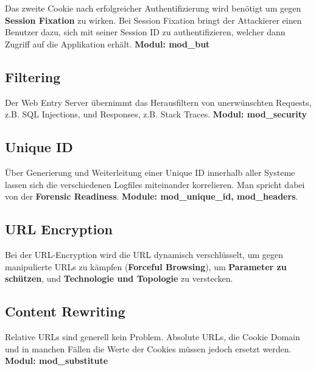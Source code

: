 Das zweite Cookie nach erfolgreicher Authentifizierung wird benötigt um gegen \textbf{Session Fixation} zu wirken. Bei Session Fixation bringt der Attackierer einen Benutzer dazu, sich mit seiner Session ID zu authentifizieren, welcher dann Zugriff auf die Applikation erhält.
\linebreak
\textbf{Modul: mod\_but}

\subsection{Filtering}
Der Web Entry Server übernimmt das Herausfiltern von unerwünschten Requests, z.B. SQL Injections, und Responses, z.B. Stack Traces.
\textbf{Modul: mod\_security}

\subsection{Unique ID}
Über Generierung und Weiterleitung einer Unique ID innerhalb aller Systeme lassen sich die verschiedenen Logfiles miteinander korrelieren. Man spricht dabei von der \textbf{Forensic Readiness}.
\textbf{Module: mod\_unique\_id, mod\_headers}.

\subsection{URL Encryption}
Bei der URL-Encryption wird die URL dynamisch verschlüsselt, um gegen manipulierte URLs zu kämpfen (\textbf{Forceful Browsing}), um \textbf{Parameter zu schützen}, und \textbf{Technologie und Topologie} zu verstecken.

\subsection{Content Rewriting}
Relative URLs sind generell kein Problem. Absolute URLs, die Cookie Domain und in manchen Fällen die Werte der Cookies müssen jedoch ersetzt werden.
\textbf{Modul: mod\_substitute}